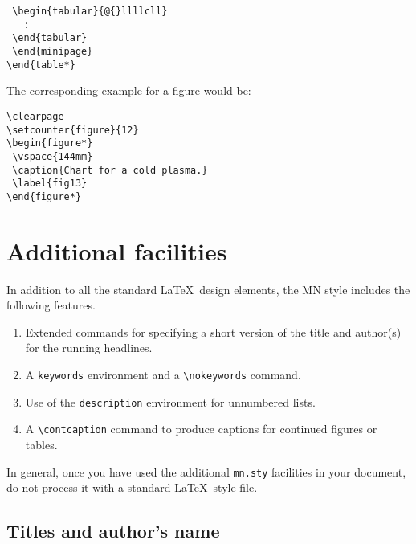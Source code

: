\begin{enumerate}
\begin{verbatim}
 \begin{tabular}{@{}llllcll}
   :
 \end{tabular}
 \end{minipage}
\end{table*}
\end{verbatim}
%
The corresponding example for a figure would be:
%
\begin{verbatim}
\clearpage
\setcounter{figure}{12}
\begin{figure*}
 \vspace{144mm}
 \caption{Chart for a cold plasma.}
 \label{fig13}
\end{figure*}
\end{verbatim}
\end{enumerate}


\section{Additional facilities}

In addition to all the standard \LaTeX\ design elements, the MN style
includes the following features.
%
\begin{enumerate}
  \item Extended commands for specifying a short version of the title and
        author(s) for the running headlines.
  \item A \verb"keywords" environment and a \verb"\nokeywords" command.
  \item Use of the \verb"description" environment for unnumbered lists.
  \item A \verb"\contcaption" command to produce captions for continued
        figures or tables.
 \end{enumerate}
%
In general, once you have used the additional \verb"mn.sty" facilities
in your document, do not process it with a standard \LaTeX\ style file.

\subsection{Titles and author's name}

